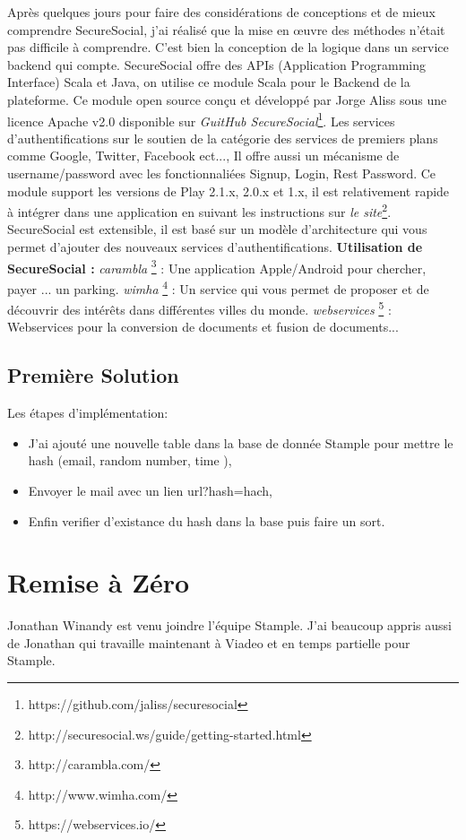 \documentclass[12pt,oneside,a4paper]{article}
\begin{document}
Après quelques jours pour faire des considérations de conceptions et de mieux comprendre SecureSocial, j'ai réalisé que la mise en œuvre des méthodes n'était pas difficile à comprendre. C'est bien la conception de la logique dans un service backend qui compte. 
SecureSocial offre des APIs (Application Programming Interface) Scala et Java, on utilise ce module Scala pour le Backend de la plateforme.
Ce module open source conçu et développé par Jorge Aliss sous une licence Apache v2.0 disponible sur \textit{GuitHub SecureSocial}\footnote{https://github.com/jaliss/securesocial}. 
Les services d'authentifications sur le soutien de la catégorie des services de premiers plans comme Google, Twitter, Facebook ect..., Il offre aussi un mécanisme de username/password avec les fonctionnaliées Signup, Login, Rest Password.
Ce module support les versions de Play 2.1.x, 2.0.x et 1.x, il est relativement rapide à intégrer dans une application en suivant les instructions sur \textit{le site}\footnote{http://securesocial.ws/guide/getting-started.html}.
SecureSocial est extensible, il est basé sur un modèle d'architecture qui vous permet d'ajouter des nouveaux services d'authentifications.
\newline
\textbf{Utilisation de SecureSocial :}
\textit{carambla} \footnote{http://carambla.com/} : Une application Apple/Android pour chercher, payer ... un parking.
\textit{wimha} \footnote{http://www.wimha.com/} : Un service qui vous permet de proposer et de découvrir des intérêts dans différentes villes du monde.
\textit{webservices} \footnote{https://webservices.io/} : Webservices pour la conversion de documents et fusion de documents...

\subsection{Première Solution}
Les étapes d'implémentation: 
\begin{itemize}
\item J'ai ajouté une nouvelle table dans la base de donnée Stample pour mettre le hash (email, random number, time ),
\item Envoyer le mail avec un lien url?hash=hach,
\item Enfin verifier d'existance du hash dans la base puis faire un sort.

\end{itemize}
 

\section{Remise à Zéro}
Jonathan Winandy est venu joindre l'équipe Stample.
J'ai beaucoup appris aussi de Jonathan qui travaille maintenant à Viadeo et en temps partielle pour Stample.
\end{document}
